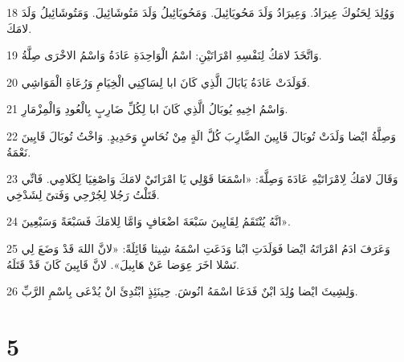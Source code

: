 \par 18 وَوُلِدَ لِحَنُوكَ عِيرَادُ. وَعِيرَادُ وَلَدَ مَحُويَائِيلَ. وَمَحُويَائِيلُ وَلَدَ مَتُوشَائِيلَ. وَمَتُوشَائِيلُ وَلَدَ لامَكَ.
\par 19 وَاتَّخَذَ لامَكُ لِنَفْسِهِ امْرَاتَيْنِ: اسْمُ الْوَاحِدَةِ عَادَةُ وَاسْمُ الاخْرَى صِلَّةُ.
\par 20 فَوَلَدَتْ عَادَةُ يَابَالَ الَّذِي كَانَ ابا لِسَاكِنِي الْخِيَامِ وَرُعَاةِ الْمَوَاشِي.
\par 21 وَاسْمُ اخِيهِ يُوبَالُ الَّذِي كَانَ ابا لِكُلِّ ضَارِبٍ بِالْعُودِ وَالْمِزْمَارِ.
\par 22 وَصِلَّةُ ايْضا وَلَدَتْ تُوبَالَ قَايِينَ الضَّارِبَ كُلَّ الَةٍ مِنْ نُحَاسٍ وَحَدِيدٍ. وَاخْتُ تُوبَالَ قَايِينَ نَعْمَةُ.
\par 23 وَقَالَ لامَكُ لِامْرَاتَيْهِ عَادَةَ وَصِلَّةَ: «اسْمَعَا قَوْلِي يَا امْرَاتَيْ لامَكَ وَاصْغِيَا لِكَلامِي. فَانِّي قَتَلْتُ رَجُلا لِجُرْحِي وَفَتىً لِشَدْخِي.
\par 24 انَّهُ يُنْتَقَمُ لِقَايِينَ سَبْعَةَ اضْعَافٍ وَامَّا لِلامَكَ فَسَبْعَةً وَسَبْعِينَ».
\par 25 وَعَرَفَ ادَمُ امْرَاتَهُ ايْضا فَوَلَدَتِ ابْنا وَدَعَتِ اسْمَهُ شِيثا قَائِلَةً: «لانَّ اللهَ قَدْ وَضَعَ لِي نَسْلا اخَرَ عِوَضا عَنْ هَابِيلَ». لانَّ قَايِينَ كَانَ قَدْ قَتَلَهُ.
\par 26 وَلِشِيثَ ايْضا وُلِدَ ابْنٌ فَدَعَا اسْمَهُ انُوشَ. حِينَئِذٍ ابْتُدِئَ انْ يُدْعَى بِاسْمِ الرَّبِّ.

\chapter{5}

